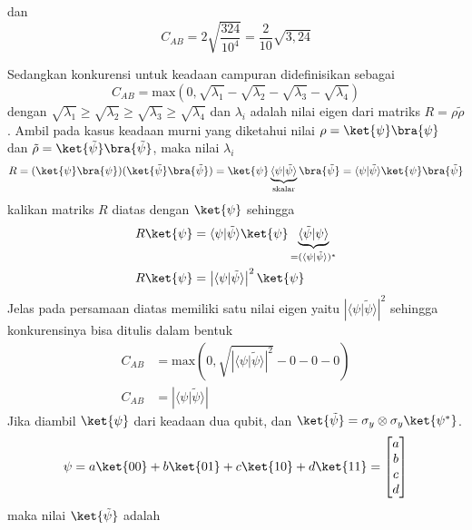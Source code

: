 dan
\begin{equation}
	C_{AB}=2\sqrt{\frac{324}{10^4}}=\frac{2}{10}\sqrt{3,24}
\end{equation}

Sedangkan konkurensi untuk keadaan campuran didefinisikan sebagai
\begin{equation*}
	C_{AB} = \text{max}(0, \sqrt{\lambda_1} - \sqrt{\lambda_2} - \sqrt{\lambda_3} - \sqrt{\lambda_4}) \label{konkurensi}
\end{equation*}
dengan $\sqrt{\lambda_1}\geq \sqrt{\lambda_2}\geq \sqrt{\lambda_3} \geq  \sqrt{\lambda_4}$ dan $\lambda_i$ adalah nilai eigen dari matriks $R = \rho \tilde{\rho}$. Ambil pada kasus keadaan murni yang diketahui nilai $\rho = \ket{\psi}\bra{\psi}$ dan $\tilde{\rho} = \ket{\tilde{\psi}}\bra{\tilde{\psi}}$, maka nilai $\lambda_i$
\begin{align*}
	R = (\ket{\psi}\bra{\psi})(\ket{\tilde{\psi}}\bra{\tilde{\psi}}) = \ket{\psi} \underbrace{\langle{\psi} |{\tilde{\psi}}\rangle}_{\text{skalar}} \bra{\tilde{\psi}} = \langle{\psi} |{\tilde{\psi}}\rangle \ket{\psi} \bra{\tilde{\psi}} 
\end{align*}
kalikan matriks $R$ diatas dengan $\ket{\psi}$ sehingga
\begin{align*}
	R\ket{\psi} & = \langle{\psi} |{\tilde{\psi}}\rangle \ket{\psi} \underbrace{\langle{\tilde{\psi}}| {\psi}\rangle}_{=(\langle{\psi} |{\tilde{\psi}}\rangle)^*}\\
	R\ket{\psi} & = \left|\langle{\psi} |{\tilde{\psi}}\rangle\right|^2  \ket{\psi} \\
\end{align*}
Jelas pada persamaan diatas memiliki satu nilai eigen yaitu $\left|\langle{\psi} |{\tilde{\psi}}\rangle\right|^2$ sehingga konkurensinya bisa ditulis dalam bentuk 
\begin{align*}
	C_{AB} &= \text{max}(0,\sqrt{\left|\langle{\psi} |{\tilde{\psi}}\rangle\right|^2}-0-0-0)\\
	C_{AB} &= \left|\langle{\psi} |{\tilde{\psi}}\rangle\right|
\end{align*}
Jika diambil $\ket{\psi}$ dari keadaan dua qubit, dan $\ket{\tilde{\psi}} = \sigma_y \otimes \sigma_y \ket{\psi^*}$.
\[ \psi = a\ket{00} + b\ket{01} + c\ket{10} + d\ket{11} = \begin{bmatrix}
	a \\ b \\ c \\ d    
\end{bmatrix}\]
maka nilai $\ket{\tilde{\psi}}$ adalah
